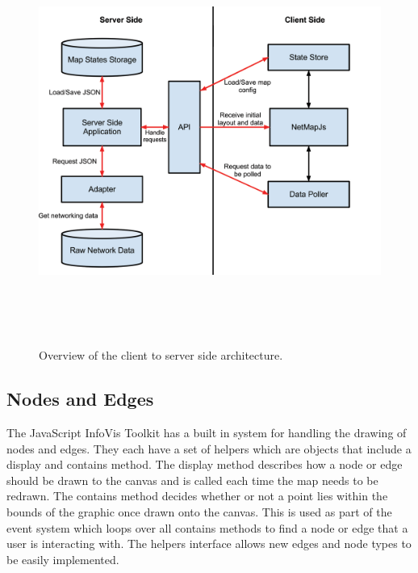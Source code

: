 \documentclass[11pt, a4paper]{article}
\begin{document}
\begin{figure}
\centering
\includegraphics[width=170mm,height=133.26mm]{assets/implementation-overview.pdf}
\caption{Overview of the client to server side architecture.}
\label{fig:implementation-overview}
\end{figure}

\subsection{Nodes and Edges}
\label{sec:nodes-and-edges.impl}

The JavaScript InfoVis Toolkit has a built in system for handling the drawing of
nodes and edges. They each have a set of helpers which are objects that include
a display and contains method. The display method describes how a node or edge
should be drawn to the canvas and is called each time the map needs to be
redrawn. The contains method decides whether or not a point lies within the
bounds of the graphic once drawn onto the canvas. This is used as part of the
event system which loops over all contains methods to find a node or edge that a
user is interacting with. The helpers interface allows new edges and node types
to be easily implemented.
\end{document}
